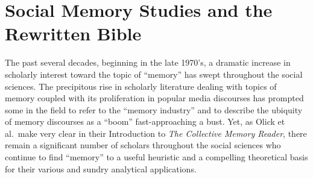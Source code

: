 \hypertarget{social-memory-studies-and-the-rwb}{%
\chapter{Social Memory Studies and the
Rewritten Bible}\label{social-memory-studies-and-the-rwb}}

The past several decades, beginning in the late 1970's, a dramatic
increase in scholarly interest toward the topic of ``memory'' has swept
throughout the social sciences. The precipitous rise in scholarly
literature dealing with topics of memory coupled with its proliferation
in popular media discourses has prompted some in the field to refer to
the ``memory industry'' and to describe the ubiquity of memory
discourses as a ``boom'' fast-approaching a
bust.\autocites{rosenfeld_jmh2009}{winter2006}{berliner_aq2005} Yet, as
Olick et al.~make very clear in their Introduction to \emph{The
Collective Memory Reader}, there remain a significant number of scholars
throughout the social sciences who continue to find ``memory'' to a
useful heuristic and a compelling theoretical basis for their various
and sundry analytical applications.\autocite[3--6]{olick_olick-etal2011}

